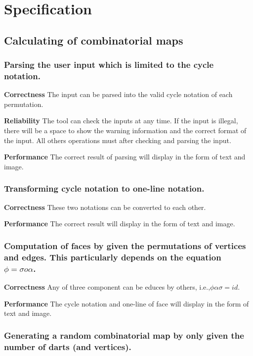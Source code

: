 
\chapter{Specification}

\section{Calculating of combinatorial maps}

\subsection*{Parsing the user input which is limited to the cycle notation.}

\textbf{Correctness} The input can be parsed into the valid cycle notation of each permutation.

\textbf{Reliability} The tool can check the inputs at any time. If the input is illegal, there will be a space to show the warning information and the correct format of the input. All others operations must after checking and parsing the input.

\textbf{Performance} The correct result of parsing will display in the form of text and image.

\subsection*{Transforming cycle notation to one-line notation.}

\textbf{Correctness} These two notations can be converted to each other.

\textbf{Performance} The correct result will display in the form of text and image.

\subsection*{Computation of faces by given the permutations of vertices and edges. This particularly depends on the equation \(\phi=\sigma o\alpha\).}

\textbf{Correctness} Any of three component can be educes by others, i.e.,\(\phi\alpha\sigma=id\).

\textbf{Performance} The cycle notation and one-line of face will display in the form of text and image.

\subsection*{Generating a random combinatorial map by only given the number of darts (and vertices).}

